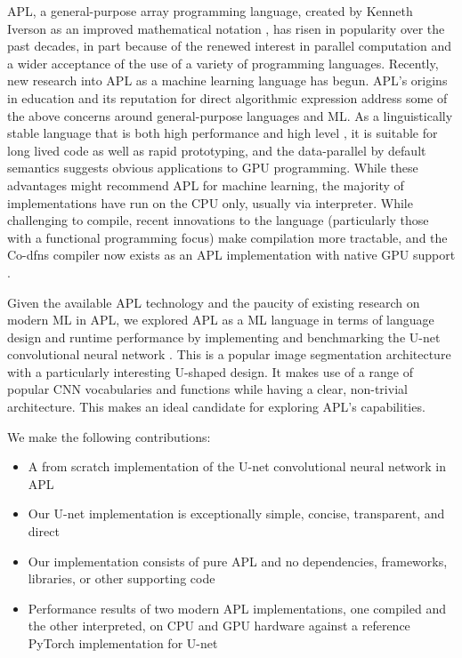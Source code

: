 \documentclass[10pt,twocolumn,english,format=sigplan,screen,balance]{acmart}
\begin{document}
APL, a general-purpose array programming language, created by Kenneth
Iverson as an improved mathematical notation \citep{apl}, has risen
in popularity over the past decades, in part because of the renewed
interest in parallel computation and a wider acceptance of the use
of a variety of programming languages. Recently, new research into
APL as a machine learning language has begun. APL's origins in education
and its reputation for direct algorithmic expression \citep{knuth1993computer,knuth2007computer}
address some of the above concerns around general-purpose languages
and ML. As a linguistically stable language that is both high performance
and high level \citep{hsu2019data}, it is suitable for long lived
code as well as rapid prototyping, and the data-parallel by default
semantics suggests obvious applications to GPU programming. While
these advantages might recommend APL for machine learning, the majority
of implementations have run on the CPU only, usually via interpreter.
While challenging to compile, recent innovations to the language (particularly
those with a functional programming focus) make compilation more tractable,
and the Co-dfns compiler now exists as an APL implementation with
native GPU support \citep{hsu2019data}. 

Given the available APL technology and the paucity of existing research
on modern ML in APL, we explored APL as a ML language in terms of
language design and runtime performance by implementing and benchmarking
the U-net convolutional neural network \citep{unet}. This is a popular
image segmentation architecture with a particularly interesting U-shaped
design. It makes use of a range of popular CNN vocabularies and functions
while having a clear, non-trivial architecture. This makes an ideal
candidate for exploring APL's capabilities.

We make the following contributions:
\begin{itemize}
\item A from scratch implementation of the U-net convolutional neural network
in APL
\item Our U-net implementation is exceptionally simple, concise, transparent,
and direct
\item Our implementation consists of pure APL and no dependencies, frameworks,
libraries, or other supporting code
\item Performance results of two modern APL implementations, one compiled
and the other interpreted, on CPU and GPU hardware against a reference
PyTorch implementation for U-net
\end{itemize}
\end{document}
